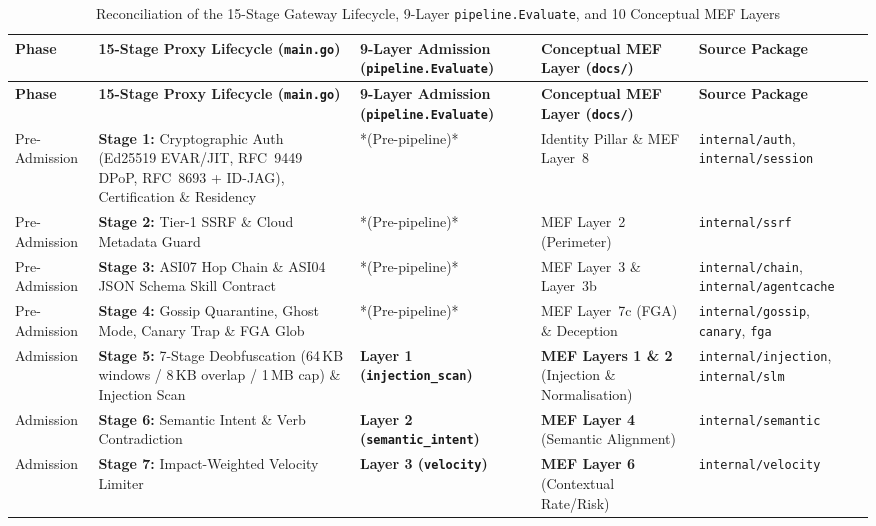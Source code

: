 \documentclass[11pt, a4paper]{article}
\begin{document}
\begin{small}
\begin{longtable}{@{} p{2.2cm} p{3.8cm} p{3.0cm} p{3.2cm} p{3.2cm} @{}}
\caption{Reconciliation of the 15-Stage Gateway Lifecycle, 9-Layer \texttt{pipeline.Evaluate}, and 10 Conceptual MEF Layers}
\label{tab:layer-mapping} \\
\toprule
\textbf{Phase} & \textbf{15-Stage Proxy Lifecycle (\texttt{main.go})} & \textbf{9-Layer Admission (\texttt{pipeline.Evaluate})} & \textbf{Conceptual MEF Layer (\texttt{docs/})} & \textbf{Source Package} \\
\midrule
\endfirsthead
\toprule
\textbf{Phase} & \textbf{15-Stage Proxy Lifecycle (\texttt{main.go})} & \textbf{9-Layer Admission (\texttt{pipeline.Evaluate})} & \textbf{Conceptual MEF Layer (\texttt{docs/})} & \textbf{Source Package} \\
\midrule
\endhead
\bottomrule
\endfoot
Pre-Admission & \textbf{Stage 1:} Cryptographic Auth (Ed25519 EVAR/JIT, RFC~9449 DPoP, RFC~8693 + ID-JAG), Certification \& Residency & *(Pre-pipeline)* & Identity Pillar \& MEF Layer~8 & \texttt{internal/auth}, \texttt{internal/session} \\
\addlinespace
Pre-Admission & \textbf{Stage 2:} Tier-1 SSRF \& Cloud Metadata Guard & *(Pre-pipeline)* & MEF Layer~2 (Perimeter) & \texttt{internal/ssrf} \\
\addlinespace
Pre-Admission & \textbf{Stage 3:} ASI07 Hop Chain \& ASI04 JSON Schema Skill Contract & *(Pre-pipeline)* & MEF Layer~3 \& Layer~3b & \texttt{internal/chain}, \texttt{internal/agentcache} \\
\addlinespace
Pre-Admission & \textbf{Stage 4:} Gossip Quarantine, Ghost Mode, Canary Trap \& FGA Glob & *(Pre-pipeline)* & MEF Layer~7c (FGA) \& Deception & \texttt{internal/gossip}, \texttt{canary}, \texttt{fga} \\
\addlinespace
Admission & \textbf{Stage 5:} 7-Stage Deobfuscation (64\,KB windows / 8\,KB overlap / 1\,MB cap) \& Injection Scan & \textbf{Layer 1 (\texttt{injection\_scan})} & \textbf{MEF Layers 1 \& 2} (Injection \& Normalisation) & \texttt{internal/injection}, \texttt{internal/slm} \\
\addlinespace
Admission & \textbf{Stage 6:} Semantic Intent \& Verb Contradiction & \textbf{Layer 2 (\texttt{semantic\_intent})} & \textbf{MEF Layer 4} (Semantic Alignment) & \texttt{internal/semantic} \\
\addlinespace
Admission & \textbf{Stage 7:} Impact-Weighted Velocity Limiter & \textbf{Layer 3 (\texttt{velocity})} & \textbf{MEF Layer 6} (Contextual Rate/Risk) & \texttt{internal/velocity} \\

\end{longtable}
\end{small}
\end{document}
